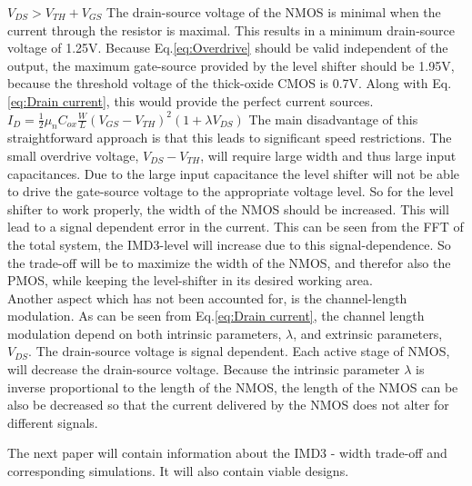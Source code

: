 $V_{DS} > V_{TH} + V_{GS}$
The drain-source voltage of the NMOS is minimal when the current through the resistor is maximal. This results in a minimum drain-source voltage of 1.25V. Because Eq.\ref{eq:Overdrive} should be valid independent of the output, the maximum gate-source provided by the level shifter should be 1.95V, because the threshold voltage of the thick-oxide CMOS is 0.7V. Along with Eq.\ref{eq:Drain current}, this would provide the perfect current sources.
$I_D = \frac{1}{2}\mu_n C_{ox}\frac{W}{L}(V_{GS}-V_{TH})^2(1+\lambda V_{DS})$
The main disadvantage of this straightforward approach is that this leads to significant speed restrictions. The small overdrive voltage, $V_{DS}-V_{TH}$, will require large width and thus large input capacitances. Due to the large input capacitance the level shifter will not be able to drive the gate-source voltage to the appropriate voltage level. So for the level shifter to work properly, the width of the NMOS should be increased. This will lead to a signal dependent error in the current. This can be seen from the FFT of the total system, the IMD3-level will increase due to this signal-dependence. So the trade-off will be to maximize the width of the NMOS, and therefor also the PMOS, while keeping the level-shifter in its desired working area.\\
Another aspect which has not been accounted for, is the channel-length modulation. As can be seen from Eq.\ref{eq:Drain current}, the channel length modulation depend on both intrinsic parameters, $\lambda$, and extrinsic parameters, $V_{DS}$. The drain-source voltage is signal dependent. Each active stage of NMOS, will decrease the drain-source voltage. Because the intrinsic parameter $\lambda$ is inverse proportional to the length of the NMOS, the length of the NMOS can be also be decreased so that the current delivered by the NMOS does not alter for different signals.

The next paper will contain information about the IMD3 - width trade-off and corresponding simulations. It will also contain viable designs.  